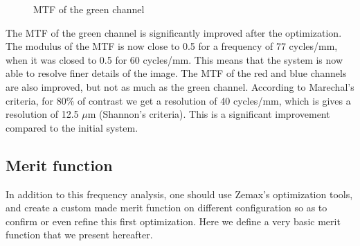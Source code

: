 \documentclass[10pt,letterpaper]{article}
\begin{document}
\begin{figure}[h]
    \centering
	\caption{MTF of the green channel}
    \label{fig:fft-green-end-tot}
\end{figure}

The MTF of the green channel is significantly improved after the optimization. The modulus of the MTF is now close to 0.5 for a frequency of 77 cycles/mm, when it was closed to 0.5 for 60 cycles/mm. This means that the system is now able to resolve finer details of the image. The MTF of the red and blue channels are also improved, but not as much as the green channel. According to Marechal's criteria, for 80\% of contrast we get a resolution of 40 cycles/mm, which is gives a resolution of 12.5 $\mu$m (Shannon's criteria). This is a significant improvement compared to the initial system.

\subsection{Merit function}
In addition to this frequency analysis, one should use Zemax's optimization tools, and create a custom made merit function on different configuration so as to confirm or even refine this first optimization. Here we define a very basic merit function that we present hereafter.
\end{document}
